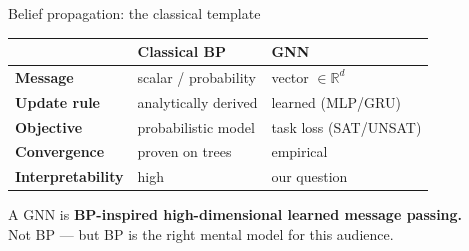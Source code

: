\documentclass[aspectratio=169,10pt,dvipsnames]{beamer}
\begin{document}
\begin{frame}{Belief propagation: the classical template}

\begin{center}
\renewcommand{\arraystretch}{1.4}
\begin{tabular}{@{}p{3.5cm}p{3.8cm}p{3.8cm}@{}}
\toprule
 & \textbf{Classical BP} & \textbf{GNN} \\
\midrule
\textbf{Message} & scalar / probability & vector $\in \mathbb{R}^d$ \\
\textbf{Update rule} & analytically derived & learned (MLP/GRU) \\
\textbf{Objective} & probabilistic model & task loss (SAT/UNSAT) \\
\textbf{Convergence} & proven on trees & empirical \\
\textbf{Interpretability} & high & \alert{our question} \\
\bottomrule
\end{tabular}
\end{center}

\bigskip
\begin{block}{}
A GNN is \textbf{BP-inspired high-dimensional learned message passing.}\\
Not BP — but BP is the right mental model for this audience.
\end{block}

\end{frame}
\end{document}

